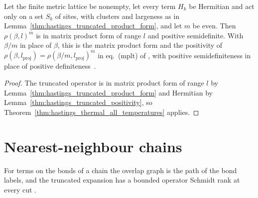 \begin{lemma}
    \label{thm:hastings_truncated_all_temperatures}
    \leanok
    Let the finite metric lattice be nonempty, let every term $H_k$ be Hermitian and act only
    on a set $S_k$ of sites, with clusters and largeness as in
    Lemma~\ref{thm:hastings_truncated_product_form}, and let $m$ be even.
    Then $\rho(\beta,l)^m$ is in matrix product form of range $l$ and positive
    semidefinite. With $\beta/m$ in place of $\beta$, this is the matrix product
    form and the positivity of
    $\rho(\beta,l_{\mathrm{proj}})=\rho(\beta/m,l_{\mathrm{proj}})^m$ in
    eq.~(mplt) of \cite[lines 1303--1317]{Hastings2006Solving}, with positive
    semidefiniteness in place of positive
    definiteness~\cite{gap:hastings05_mplt_positivity}.
\end{lemma}
\begin{proof}\leanok
    The truncated operator is in matrix product form of range $l$ by
    Lemma~\ref{thm:hastings_truncated_product_form} and Hermitian by
    Lemma~\ref{thm:hastings_truncated_positivity}, so
    Theorem~\ref{thm:hastings_thermal_all_temperatures} applies.
\end{proof}

\section{Nearest-neighbour chains}
\label{sec:cluster_expansion_nearest_neighbour}

For terms on the bonds of a chain the overlap graph is the path of the bond
labels, and the truncated expansion has a bounded operator Schmidt rank at
every cut \cite[lines 1298--1303 and 1971--2013]{Arad2016RigorousRG}.

